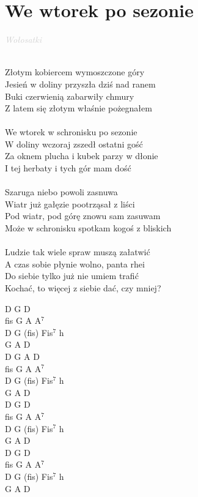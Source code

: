 \documentclass[a5paper, 10pt]{book}
\begin{document}
\section{We wtorek po sezonie}\textcolor{lightgray}{\textit{Wołosatki}}\\~\\
\begin{minipage}[t]{0.7\textwidth}
Złotym kobiercem wymoszczone góry\\
Jesień w doliny przyszła dziś nad ranem\\
Buki czerwienią zabarwiły chmury\\
Z latem się złotym właśnie pożegnałem\\
\\
\hspace*{5mm}We wtorek w schronisku po sezonie\\
\hspace*{5mm}W doliny wczoraj zszedł ostatni gość\\
\hspace*{5mm}Za oknem plucha i kubek parzy w dłonie\\
\hspace*{5mm}I tej herbaty i tych gór mam dość\\
\\
Szaruga niebo powoli zasnuwa\\
Wiatr już gałęzie pootrząsał z liści\\
Pod wiatr, pod górę znowu sam zasuwam\\
Może w schronisku spotkam kogoś z bliskich\\
\\
Ludzie tak wiele spraw muszą załatwić\\
A czas sobie płynie wolno, panta rhei\\
Do siebie tylko już nie umiem trafić\\
Kochać, to więcej z siebie dać, czy mniej?\\
\end{minipage}
\begin{minipage}[t]{0.3\textwidth}
D G D\\
fis G A A$^7$\\
D G (fis) Fis$^7$ h\\
G A D\\

D G A D\\
fis G A A$^7$\\
D G (fis) Fis$^7$ h\\
G A D\\

D G D\\
fis G A A$^7$\\
D G (fis) Fis$^7$ h\\
G A D\\

D G D\\
fis G A A$^7$\\
D G (fis) Fis$^7$ h\\
G A D\\
\end{minipage}
\end{document}
